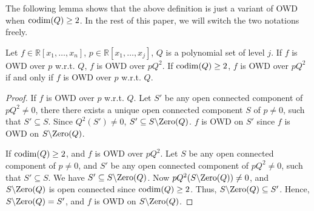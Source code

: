 \documentclass[amsthm]{elsart}
\def \codim {{\rm codim}}
\def  \zero {{\rm Zero}}
\def \RR {{\mathbb R}}
\begin{document}
The following lemma shows that the above definition is just a variant of OWD when $\codim(Q)\ge2$. In the rest of this paper, we will switch the two notations freely. \begin{lem}\label{lem:owdeq}
  Let $f\in\RR[x_1,\ldots,x_n]$, $p\in \RR[x_1,\ldots,x_j]$, $Q$ is a polynomial set of level $j$. If $f$ is OWD over $p$ w.r.t. $Q$, $f$ is OWD over $pQ^2$. If $\codim(Q)\ge2$, $f$ is OWD over $pQ^2$ if and only if $f$ is OWD over $p$ w.r.t. $Q$. \end{lem}
\begin{proof}
If $f$ is OWD over $p$ w.r.t. $Q$. Let $S'$ be any open connected component of $pQ^2\neq0$, there there exists a unique open connected component $S$ of $p\neq0$, such that $S'\subseteq S$. Since $Q^2(S')\neq0$, $S'\subseteq S\backslash\zero(Q)$.  $f$ is OWD on $S'$ since $f$ is OWD on $S\backslash\zero(Q)$.

If $\codim(Q)\ge2$, and $f$ is OWD over $pQ^2$. Let $S$ be any open connected component of $p\neq0$, and $S'$ be any open connected component of $pQ^2\neq0$, such that $S'\subseteq S$. We have $S'\subseteq S\backslash\zero(Q)$. Now $pQ^2(S\backslash\zero(Q))\neq0$, and $S\backslash\zero(Q)$ is open connected since $\codim(Q)\ge2$. Thus, $S\backslash\zero(Q)\subseteq S'$. Hence, $S\backslash\zero(Q)=S'$, and $f$ is OWD on $S\backslash\zero(Q)$.
\end{proof}
\begin{comment}
      and $S'\bigcap $

   We only need to prove that there is a one to one correspondence between open connected component $S'$ of $pQ^2\neq0$ and open connected component $S$ of $p\neq0$, and $S\backslash\zero(Q)=S'$.

  Let $S'$ be any open connected component of $pQ^2\neq0$, there exists a unique open connected component $S$ of $p\neq0$, such that $S'\subseteq S$. On one side, since $Q^2(S')\neq0$, $S'\subseteq S\backslash\zero(Q)$. On the other side, $pQ^2(S\backslash\zero(Q))\neq0$, and $S\backslash\zero(Q)\subseteq S'$ since $S\backslash\zero(Q)$ is open connected by the definition of $Q$. Thus, $S\backslash\zero(Q)=S'$.

  Let $S$ be any open connected component of $p\neq0$, there exists an open connected component $S'$ of $pQ^2\neq0$, such that $S'\subseteq S$. Repeat the above argument again, we see that $S\backslash\zero(Q)=S'$.
\end{comment}
\end{document}
